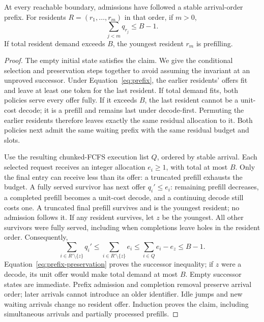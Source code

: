 \begin{lemma}\label{lem:prefix}
At every reachable boundary, admissions have followed a stable arrival-order
prefix. For residents $R=(r_1,\ldots,r_m)$ in that order, if $m>0$,
\begin{equation}\label{eq:prefix}
 \sum_{j<m}q_{r_j}\leq B-1.
\end{equation}
If total resident demand exceeds $B$, the youngest resident $r_m$ is prefilling.
\end{lemma}
\begin{proof}
The empty initial state satisfies the claim. We give the conditional
selection and preservation steps together to avoid assuming the invariant
at an unproved successor. Under Equation~\ref{eq:prefix}, the earlier
residents' offers fit and leave at least one token for the last resident.
If total demand fits, both policies serve every offer fully. If it exceeds
$B$, the last resident cannot be a unit-cost decode; it is a prefill and
remains last under decode-first. Permuting the earlier residents therefore
leaves exactly the same residual allocation to it. Both policies next
admit the same waiting prefix with the same residual budget and slots.

Use the resulting chunked-FCFS execution list $Q$, ordered by stable arrival.
Each selected request receives an integer allocation $e_i\geq1$, with total
at most $B$. Only the final entry can receive less than its offer: a
truncated prefill exhausts the budget. A fully served survivor has next
offer $q_i'\leq e_i$: remaining prefill decreases, a completed prefill
becomes a unit-cost decode, and a continuing decode still costs one.
A truncated final prefill survives and is the youngest resident; no
admission follows it. If any resident survives, let $z$ be the youngest.
All other survivors were fully served, including when completions leave
holes in the resident order. Consequently,
\begin{equation}\label{eq:prefix-preservation}
 \sum_{i\in R'\setminus\{z\}}q_i'
 \leq\sum_{i\in R'\setminus\{z\}}e_i
 \leq\sum_{i\in Q}e_i-e_z\leq B-1.
\end{equation}
Equation~\ref{eq:prefix-preservation} proves the successor inequality; if
$z$ were a decode, its unit offer would make total demand at most $B$.
Empty successor states are immediate. Prefix admission and completion
removal preserve arrival order; later arrivals cannot introduce an older
identifier. Idle jumps and new waiting arrivals change no resident offer.
Induction proves the claim, including simultaneous arrivals and partially
processed prefills.
\end{proof}

